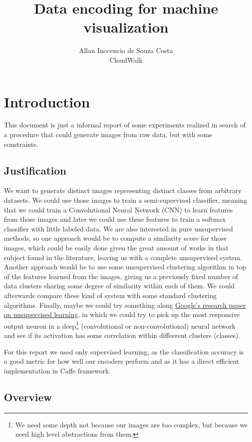 \documentclass[11pt]{article}
\title{\textbf{Data encoding for machine visualization}}
\author{Allan Inocencio de Souza Costa\\
		CloudWalk}
\date{}
\begin{document}
\maketitle

\section{Introduction}

This document is just a informal report of some experiments realized in search of a procedure that could generate images from raw data, but with some constraints. 

\subsection{Justification}

We want to generate distinct images representing distinct classes from arbitrary datasets. We could use those images to train a semi-supervised classifier, meaning that we could train a Convolutional Neural Network (CNN) to learn features from those images and later we could use these features to train a softmax classifier with little labeled data. We are also interested in pure unsupervised methods, so one approach would be to compute a similarity score for those images, which could be easily done given the great amount of works in that subject found in the literature, leaving us with a complete unsupervised system. Another approach would be to use some unsupervised clustering algorithm in top of the features learned from the images, giving us a previously fixed number of data clusters sharing some degree of similarity within each of them. We could afterwards compare these kind of system with some standard clustering algorithms. Finally, maybe we could try something along \href{http://arxiv.org/pdf/1112.6209.pdf}{Google's research paper on unsupervised learning}, in which we could try to pick up the most responsive output neuron in a deep\footnote{We need some depth not because our images are too complex, but because we need high level abstractions from them.} (convolutional or non-convolutional) neural network and see if its activation has some correlation within diffeerent clusters (classes). 

For this report we used only supervised learning, as the classification accuracy is a good metric for how well our encoders perform and as it has a direct efficient implementation in Caffe framework.

\subsection{Overview}
\end{document}
